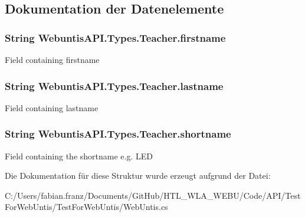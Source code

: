 \subsection{Dokumentation der Datenelemente}
\hypertarget{struct_webuntis_a_p_i_1_1_types_1_1_teacher_a60aa3278d7509fea3a5fd3e9d7e12e91}{
\subsubsection[{firstname}]{\setlength{\rightskip}{0pt plus 5cm}String Webuntis\-A\-P\-I.\-Types.\-Teacher.\-firstname}}\label{struct_webuntis_a_p_i_1_1_types_1_1_teacher_a60aa3278d7509fea3a5fd3e9d7e12e91}
Field containing firstname \hypertarget{struct_webuntis_a_p_i_1_1_types_1_1_teacher_add1e2bb30e82e7ff0b14b3d497c44fcc}{
\subsubsection[{lastname}]{\setlength{\rightskip}{0pt plus 5cm}String Webuntis\-A\-P\-I.\-Types.\-Teacher.\-lastname}}\label{struct_webuntis_a_p_i_1_1_types_1_1_teacher_add1e2bb30e82e7ff0b14b3d497c44fcc}
Field containing lastname \hypertarget{struct_webuntis_a_p_i_1_1_types_1_1_teacher_ad4fe004e4ae11294e487a92947f3ff41}{
\subsubsection[{shortname}]{\setlength{\rightskip}{0pt plus 5cm}String Webuntis\-A\-P\-I.\-Types.\-Teacher.\-shortname}}\label{struct_webuntis_a_p_i_1_1_types_1_1_teacher_ad4fe004e4ae11294e487a92947f3ff41}
Field containing the shortname e.\-g. L\-E\-D 

Die Dokumentation für diese Struktur wurde erzeugt aufgrund der Datei\-:\begin{DoxyCompactItemize}
\item 
C\-:/\-Users/fabian.\-franz/\-Documents/\-Git\-Hub/\-H\-T\-L\-\_\-\-W\-L\-A\-\_\-\-W\-E\-B\-U/\-Code/\-A\-P\-I/\-Test\-For\-Web\-Untis/\-Test\-For\-Web\-Untis/Web\-Untis.\-cs\end{DoxyCompactItemize}
